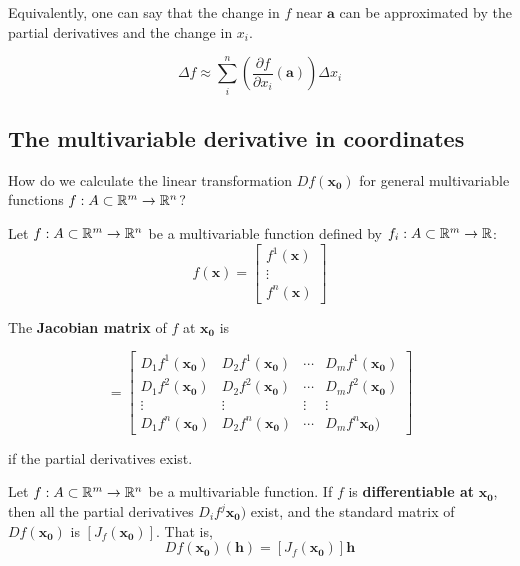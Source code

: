 Equivalently, one can say that the change in $f$ near $\bm{a}$ can be approximated by the partial derivatives and the change in $x_i$.
    
    
    $$\Delta f \approx \sum_{i}^n \left(\frac{\partial f}{\partial x_i}(\bm{a})\right)\Delta x_i$$

\subsection{The multivariable derivative in coordinates}

\begin{question}
    How do we calculate the linear transformation $Df(\bm{x_0})$ for general multivariable functions $f : A \subset \mathbb{R}^m \to \mathbb{R}^n$?
    \end{question}


\begin{definition}
    Let $f : A \subset \mathbb{R}^m \to \mathbb{R}^n$ be a multivariable function defined by $f_i  : A \subset \mathbb{R}^m \to \mathbb{R}$:
    \begin{equation*}
        f(\bm{x}) = \begin{bmatrix}
f^1(\bm{x}) \\
\vdots \\
f^n(\bm{x})
\end{bmatrix}
    \end{equation*}
    
    The \textbf{Jacobian matrix} of $f$ at $\bm{x_0}$ is 
    
    \begin{equation*}
        [J_f(\bm{x_0})] = \begin{bmatrix}
D_1f^1(\bm{x_0}) & D_2f^1(\bm{x_0}) & \cdots & D_mf^1(\bm{x_0}) \\
D_1f^2(\bm{x_0}) & D_2f^2(\bm{x_0}) & \cdots & D_mf^2(\bm{x_0}) \\
\vdots & \vdots & \vdots & \vdots\\
D_1f^n(\bm{x_0}) & D_2f^n(\bm{x_0}) & \cdots & D_mf^n\bm{x_0}) 
\end{bmatrix}
    \end{equation*}
    
    if the partial derivatives exist.
    
    \end{definition}

\begin{theorem}
    Let  $f : A \subset \mathbb{R}^m \to \mathbb{R}^n$ be a multivariable function.  If $f$ is \textbf{differentiable at} $\bm{x_0}$, then all the partial derivatives $D_if^j\bm{x_0})$ exist, and the standard matrix of $Df(\bm{x_0})$ is $[J_f(\bm{x_0})]$.  That is,
    $$Df(\bm{x_0})(\bm{h}) = [J_f(\bm{x_0})]\bm{h}$$
    
    \end{theorem}

